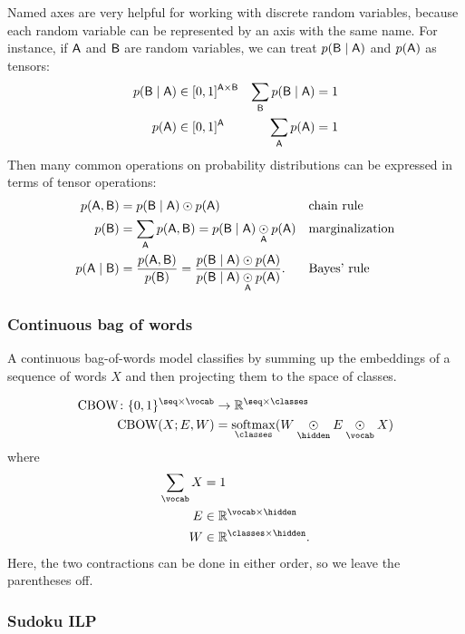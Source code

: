\documentclass{article}
\newcommand{\reals}{\mathbb{R}}
\begin{document}
Named axes are very helpful for working with discrete random variables, because each random variable can be represented by an axis with the same name. For instance, if $\mathsf{A}$ and $\mathsf{B}$ are random variables, we can treat $p(\mathsf{B} \mid \mathsf{A})$ and $p(\mathsf{A})$ as tensors:
\begin{align*}
p(\mathsf{B} \mid \mathsf{A}) &\in [0, 1]^{\mathsf{A} \times \mathsf{B}} & \sum\limits_{\substack{\mathsf{B}}} p(\mathsf{B} \mid \mathsf{A}) &= 1 \\
p(\mathsf{A}) &\in [0, 1]^{\mathsf{A}} & \sum\limits_{\substack{\mathsf{A}}} p(\mathsf{A}) &= 1
\end{align*}
Then many common operations on probability distributions can be expressed in terms of tensor operations:
\begin{align*}
p(\mathsf{A}, \mathsf{B}) &= p(\mathsf{B} \mid \mathsf{A}) \odot p(\mathsf{A}) && \text{chain rule}\\
p(\mathsf{B}) &= \sum\limits_{\substack{\mathsf{A}}} p(\mathsf{A}, \mathsf{B}) = p(\mathsf{B} \mid \mathsf{A}) \mathbin{\underset{\substack{\mathsf{A}}}{\odot}} p(\mathsf{A}) && \text{marginalization} \\
p(\mathsf{A} \mid \mathsf{B}) &= \frac{p(\mathsf{A}, \mathsf{B})}{p(\mathsf{B})} = \frac{p(\mathsf{B} \mid \mathsf{A}) \odot p(\mathsf{A})}{p(\mathsf{B} \mid \mathsf{A}) \mathbin{\underset{\substack{\mathsf{A}}}{\odot}} p(\mathsf{A})}. && \text{Bayes' rule}
\end{align*}

\subsubsection{Continuous bag of words}

A continuous bag-of-words model classifies by summing up the embeddings of a sequence of words $X$ and then projecting them to the space of classes. 

\begin{align*}
\text{CBOW} \colon \{0, 1\}^{\seq \times \vocab} &\rightarrow \reals^{\seq \times \classes} \\
\text{CBOW}(X; E, W) &= \nfun{\classes}{softmax} (W \ndot{\hidden} E \ndot{\vocab} X)
\end{align*}
where
\begin{align*}
\nsum{\vocab} X &= 1 \\
E &\in \reals^{\vocab \times \hidden} \\
W &\in \reals^{\classes \times \hidden}.
\end{align*}
Here, the two contractions can be done in either order, so we leave the parentheses off.

\subsubsection{Sudoku ILP}
\end{document}
